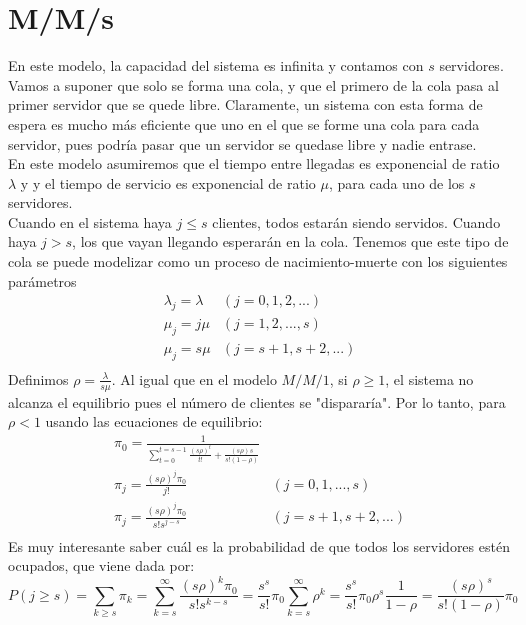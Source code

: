 	\section{M/M/s}
		En este modelo, la capacidad del sistema es infinita y contamos con $s$ servidores. Vamos a suponer que solo se forma una cola, y que el primero de la cola pasa al primer servidor que se quede libre. Claramente, un sistema con esta forma de espera es mucho m\'as eficiente que uno en el que se forme una cola para cada servidor, pues podr\'ia pasar que un servidor se quedase libre y nadie entrase.\\
		\hspace{0.5cm}En este modelo asumiremos que el tiempo entre llegadas es exponencial de ratio $\lambda$ y y el tiempo de servicio es exponencial de ratio $\mu$, para cada uno de los $s$ servidores.\\
		\hspace{0.5cm}Cuando en el sistema haya $j\leq s$ clientes, todos estar\'an siendo servidos. Cuando haya $j>s$, los que vayan llegando esperar\'an en la cola. Tenemos que este tipo de cola se puede modelizar como un proceso de nacimiento-muerte con los siguientes par\'ametros
		$$\begin{array}{cc}
		\lambda_j=\lambda & (j=0,1,2,...)\\
		\mu_j=j\mu & (j=1,2,...,s)\\
		\mu_j=s\mu & (j=s+1,s+2,...)\\
		\end{array}$$
		\hspace{0.5cm}Definimos $\rho=\displaystyle\frac{\lambda}{s\mu}$. Al igual que en el modelo $M/M/1$, si $\rho\geq1$, el sistema no alcanza el equilibrio pues el n\'umero de clientes se "disparar\'ia". Por lo tanto, para $\rho<1$ usando las ecuaciones de equilibrio:
		$$\begin{array}{cc}
		\pi_0=\displaystyle\frac{1}{\displaystyle \sum_{t=0}^{t=s-1}\frac{(s\rho)^t}{t!}+\frac{(s\rho)s}{s!(1-\rho)}} & \\
		\pi_j=\displaystyle\frac{(s\rho)^j\pi_0}{j!} & (j=0,1,...,s)\\
		\pi_j=\displaystyle\frac{(s\rho)^j\pi_0}{s!s^{j-s}} & (j=s+1,s+2,...)\\
		\end{array}$$
		\hspace{0.5cm} Es muy interesante saber cu\'al es la probabilidad de que todos los servidores est\'en ocupados, que viene dada por:
		$$P(j\geq s)=\sum_{k\geq s}^{}\pi_k=\sum_{k=s}^{\infty}\frac{(s\rho)^k\pi_0}{s!s^{k-s}}=\frac{s^s}{s!}\pi_0\sum_{k=s}^{\infty}\rho^k=\frac{s^s}{s!}\pi_0\rho^s\frac{1}{1-\rho}=\frac{(s\rho)^s}{s!(1-\rho)}\pi_0$$
			
